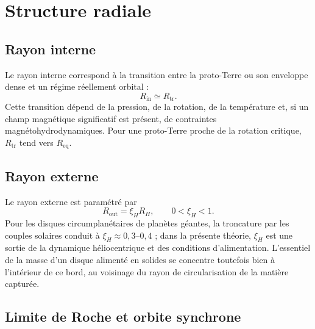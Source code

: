 \documentclass[11pt,a4paper,openany]{report}
\newcommand{\Req}{R_{\mathrm{eq}}}
\begin{document}

\section{Structure radiale}
\subsection{Rayon interne}

Le rayon interne correspond à la transition entre la proto-Terre ou son enveloppe dense et un
régime réellement orbital :
\begin{equation}
R_{\mathrm{in}}\simeq R_{\mathrm{tr}}.
\label{eq:Rin}
\end{equation}
Cette transition dépend de la pression, de la rotation, de la température et, si un champ
magnétique significatif est présent, de contraintes magnétohydrodynamiques. Pour une
proto-Terre proche de la rotation critique, $R_{\mathrm{tr}}$ tend vers $\Req$.

\subsection{Rayon externe}

Le rayon externe est paramétré par
\begin{equation}
R_{\mathrm{out}}=\xi_H R_H,\qquad 0<\xi_H<1.
\label{eq:Rout}
\end{equation}
Pour les disques circumplanétaires de planètes géantes, la troncature par les couples solaires
conduit à $\xi_H\approx0{,}3$--$0{,}4$ \cite{QuillenTrilling1998,MartinLubow2011} ; dans la présente
théorie, $\xi_H$ est une sortie de la dynamique héliocentrique et des conditions d'alimentation.
L'essentiel de la masse d'un disque alimenté en solides se concentre toutefois bien à l'intérieur
de ce bord, au voisinage du rayon de circularisation de la matière capturée.

\subsection{Limite de Roche et orbite synchrone}
\end{document}
